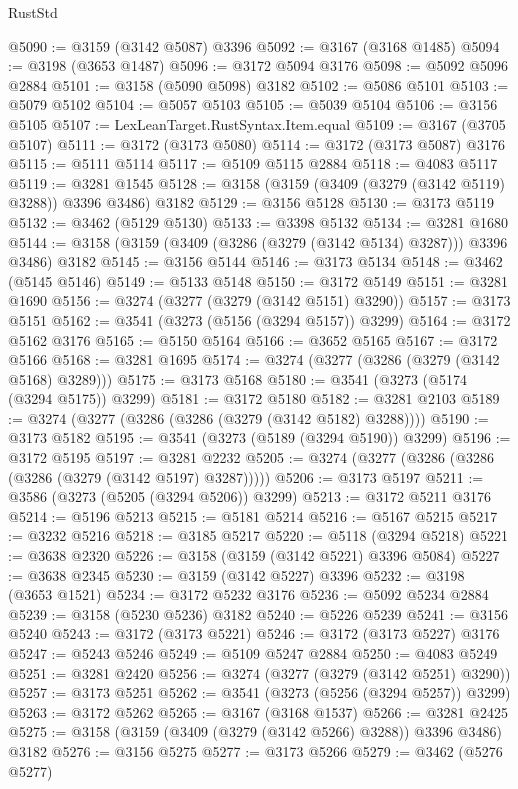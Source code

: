 \begin{lexlean}{RustStd}
\begin{coremodule}
@5090 := @3159 (@3142 @5087) @3396
@5092 := @3167 (@3168 @1485)
@5094 := @3198 (@3653 @1487)
@5096 := @3172 @5094 @3176
@5098 := @5092 @5096 @2884
@5101 := @3158 (@5090 @5098) @3182
@5102 := @5086 @5101
@5103 := @5079 @5102
@5104 := @5057 @5103
@5105 := @5039 @5104
@5106 := @3156 @5105
@5107 := LexLeanTarget.RustSyntax.Item.equal
@5109 := @3167 (@3705 @5107)
@5111 := @3172 (@3173 @5080)
@5114 := @3172 (@3173 @5087) @3176
@5115 := @5111 @5114
@5117 := @5109 @5115 @2884
@5118 := @4083 @5117
@5119 := @3281 @1545
@5128 := @3158 (@3159 (@3409 (@3279 (@3142 @5119) @3288)) @3396 @3486) @3182
@5129 := @3156 @5128
@5130 := @3173 @5119
@5132 := @3462 (@5129 @5130)
@5133 := @3398 @5132
@5134 := @3281 @1680
@5144 := @3158 (@3159 (@3409 (@3286 (@3279 (@3142 @5134) @3287))) @3396 @3486) @3182
@5145 := @3156 @5144
@5146 := @3173 @5134
@5148 := @3462 (@5145 @5146)
@5149 := @5133 @5148
@5150 := @3172 @5149
@5151 := @3281 @1690
@5156 := @3274 (@3277 (@3279 (@3142 @5151) @3290))
@5157 := @3173 @5151
@5162 := @3541 (@3273 (@5156 (@3294 @5157)) @3299)
@5164 := @3172 @5162 @3176
@5165 := @5150 @5164
@5166 := @3652 @5165
@5167 := @3172 @5166
@5168 := @3281 @1695
@5174 := @3274 (@3277 (@3286 (@3279 (@3142 @5168) @3289)))
@5175 := @3173 @5168
@5180 := @3541 (@3273 (@5174 (@3294 @5175)) @3299)
@5181 := @3172 @5180
@5182 := @3281 @2103
@5189 := @3274 (@3277 (@3286 (@3286 (@3279 (@3142 @5182) @3288))))
@5190 := @3173 @5182
@5195 := @3541 (@3273 (@5189 (@3294 @5190)) @3299)
@5196 := @3172 @5195
@5197 := @3281 @2232
@5205 := @3274 (@3277 (@3286 (@3286 (@3286 (@3279 (@3142 @5197) @3287)))))
@5206 := @3173 @5197
@5211 := @3586 (@3273 (@5205 (@3294 @5206)) @3299)
@5213 := @3172 @5211 @3176
@5214 := @5196 @5213
@5215 := @5181 @5214
@5216 := @5167 @5215
@5217 := @3232 @5216
@5218 := @3185 @5217
@5220 := @5118 (@3294 @5218)
@5221 := @3638 @2320
@5226 := @3158 (@3159 (@3142 @5221) @3396 @5084)
@5227 := @3638 @2345
@5230 := @3159 (@3142 @5227) @3396
@5232 := @3198 (@3653 @1521)
@5234 := @3172 @5232 @3176
@5236 := @5092 @5234 @2884
@5239 := @3158 (@5230 @5236) @3182
@5240 := @5226 @5239
@5241 := @3156 @5240
@5243 := @3172 (@3173 @5221)
@5246 := @3172 (@3173 @5227) @3176
@5247 := @5243 @5246
@5249 := @5109 @5247 @2884
@5250 := @4083 @5249
@5251 := @3281 @2420
@5256 := @3274 (@3277 (@3279 (@3142 @5251) @3290))
@5257 := @3173 @5251
@5262 := @3541 (@3273 (@5256 (@3294 @5257)) @3299)
@5263 := @3172 @5262
@5265 := @3167 (@3168 @1537)
@5266 := @3281 @2425
@5275 := @3158 (@3159 (@3409 (@3279 (@3142 @5266) @3288)) @3396 @3486) @3182
@5276 := @3156 @5275
@5277 := @3173 @5266
@5279 := @3462 (@5276 @5277)

\end{coremodule}
\end{lexlean}
